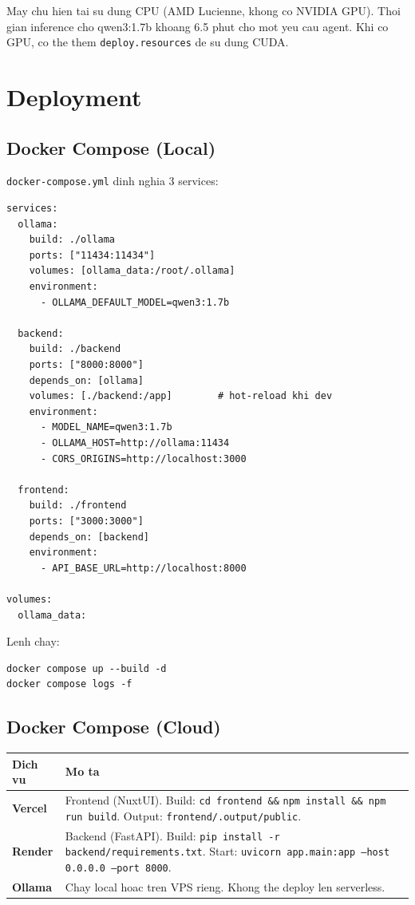 \documentclass[12pt,a4paper]{article}
\begin{document}
May chu hien tai su dung CPU (AMD Lucienne, khong co NVIDIA GPU).
Thoi gian inference cho qwen3:1.7b khoang 6.5 phut cho mot yeu cau agent.
Khi co GPU, co the them \texttt{deploy.resources} de su dung CUDA.

\section{Deployment}

\subsection{Docker Compose (Local)}

\texttt{docker-compose.yml} dinh nghia 3 services:

\begin{lstlisting}[style=bash, language={}]
services:
  ollama:
    build: ./ollama
    ports: ["11434:11434"]
    volumes: [ollama_data:/root/.ollama]
    environment:
      - OLLAMA_DEFAULT_MODEL=qwen3:1.7b

  backend:
    build: ./backend
    ports: ["8000:8000"]
    depends_on: [ollama]
    volumes: [./backend:/app]        # hot-reload khi dev
    environment:
      - MODEL_NAME=qwen3:1.7b
      - OLLAMA_HOST=http://ollama:11434
      - CORS_ORIGINS=http://localhost:3000

  frontend:
    build: ./frontend
    ports: ["3000:3000"]
    depends_on: [backend]
    environment:
      - API_BASE_URL=http://localhost:8000

volumes:
  ollama_data:
\end{lstlisting}

Lenh chay:
\begin{lstlisting}[style=bash, language={}]
docker compose up --build -d
docker compose logs -f
\end{lstlisting}

\subsection{Docker Compose (Cloud)}

\begin{tabularx}{\textwidth}{lX}
\toprule
\bfseries Dich vu & \bfseries Mo ta \\
\midrule
\textbf{Vercel} & Frontend (NuxtUI). Build: \texttt{cd frontend \&\&}
                  \texttt{npm install \&\& npm run build}. Output:
                  \texttt{frontend/.output/public}. \\
\textbf{Render}  & Backend (FastAPI). Build: \texttt{pip install -r
                  backend/requirements.txt}. Start: \texttt{uvicorn
                  app.main:app --host 0.0.0.0 --port 8000}. \\
\textbf{Ollama}  & Chay local hoac tren VPS rieng. Khong the deploy len
                  serverless. \\
\bottomrule
\end{tabularx}
\end{document}
